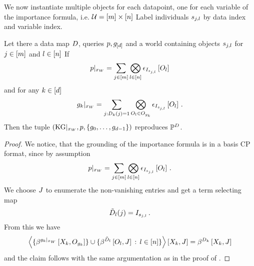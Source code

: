 %
We now instantiate multiple objects for each datapoint, one for each variable of the importance formula, i.e. $\mathcal{U}=[m]\times[n]$
Label individuals $s_{j,l}$ by data index and variable index.

\begin{lemma}
    Let there a data map $D$, queries $p,g_{[d]}$ and a \firstOrderLogic{} world containing objects $s_{j,l}$ for $j\in[m]$ and $l\in[n]$
    If
    \begin{align*}
        {p}|_{x_{W}}
        = \sum_{j\in[m]} \bigotimes_{l\in[n]} \epsilon_{I_{s_{j,l}}}\left[O_{l}\right]
    \end{align*}
    and for any $k\in[d]$
    \begin{align*}
        {g_{k}}|_{x_{W}}
        = \sum_{j : D_{k}(j)=1} \bigotimes_{O_{l} \in O_{g_{k}}}
        \epsilon_{I_{s_{j,l}}}\left[O_{l}\right] \, .
    \end{align*}
    Then the tuple $(\mathrm{KG}|_{x_{W}},p,\{g_{0},\ldots,g_{d-1}\})$ reproduces $\mathbb{P}^{D}$.
\end{lemma}
\begin{proof}
    We notice, that the grounding of the importance formula is in a basis CP format, since by assumption
    \begin{align*}
        {p}|_{x_{W}}
        = \sum_{j\in[m]} \bigotimes_{l\in[n]} \epsilon_{I_{s_{j,l}}}\left[O_{l}\right] \, .
    \end{align*}
    We choose $J$ to enumerate the non-vanishing entries and get a term selecting map
    \begin{align*}
        \tilde{D}_{l}(j) = I_{s_{j,l}} \, .
    \end{align*}
    From this we have
    \begin{align*}
        \left\langle 
            \{\beta^{{g_{k}}|_{x_{W}}}\left[X_{k},O_{g_{k}}\right]\} \cup
            \{\beta^{\tilde{D}_{l}}\left[O_{l},J\right] \, : \, l\in[n]\}
        \right\rangle \left[ X_{k},J \right]
        = \beta^{D_{k}}\left[X_{k},J\right]
    \end{align*}
    and the claim follows with the same argumentation as in the proof of .
\end{proof}


